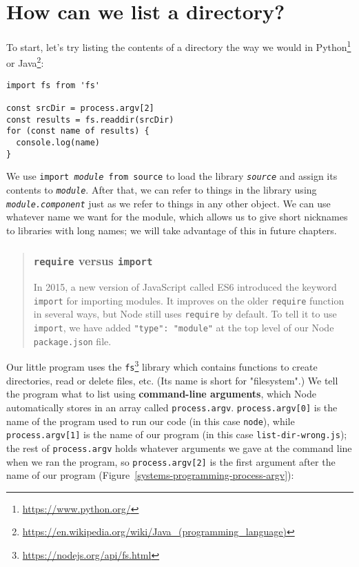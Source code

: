\documentclass[krantzl]{krantz}
\newcommand{\figref}[1]{Figure~\ref{#1}}
\newcommand{\glossref}[1]{\textbf{#1}}
\newenvironment{callout}{\savenotes\begin{tBox}\begin{quotation}\toggletrue{inbox}\renewcommand{\thempfootnote}{\arabic{footnote}}}{\end{quotation}\vspace{\baselineskip}\end{tBox}\togglefalse{inbox}\spewnotes}
\newcommand{\hreffoot}[2]{{#1}\footnote{\href{#2}{#2}}}
\begin{document}
\section{How can we list a directory?}\label{systems-programming-ls}


To start,
let's try listing the contents of a directory the way we would in \hreffoot{Python}{https://www.python.org/}
or \hreffoot{Java}{https://en.wikipedia.org/wiki/Java\_(programming\_language)}:


\begin{lstlisting}[frame=single,frameround=tttt]
import fs from 'fs'

const srcDir = process.argv[2]
const results = fs.readdir(srcDir)
for (const name of results) {
  console.log(name)
}
\end{lstlisting}



\noindent We use \texttt{import \emph{module} from {\textquotesingle}source{\textquotesingle}} to load the library \texttt{\emph{source}}
and assign its contents to \texttt{\emph{module}}.
After that,
we can refer to things in the library using \texttt{\emph{module.component}}
just as we refer to things in any other object.
We can use whatever name we want for the module,
which allows us to give short nicknames to libraries with long names;
we will take advantage of this in future chapters.

\begin{callout}


\subsubsection*{\texttt{require} versus \texttt{import}}


In 2015, a new version of JavaScript called ES6 introduced
the keyword \texttt{import} for importing modules.
It improves on the older \texttt{require} function in several ways,
but Node still uses \texttt{require} by default.
To tell it to use \texttt{import},
we have added \texttt{"type": "module"} at the top level of our Node \texttt{package.json} file.

\end{callout}


Our little program uses the \hreffoot{\texttt{fs}}{https://nodejs.org/api/fs.html} library
which contains functions to create directories, read or delete files, etc.
(Its name is short for "filesystem".)
We tell the program what to list using \glossref{command-line arguments},
which Node automatically stores in an array called \texttt{process.argv}.
\texttt{process.argv[0]} is the name of the program used to run our code (in this case \texttt{node}),
while \texttt{process.argv[1]} is the name of our program (in this case \texttt{list-dir-wrong.js});
the rest of \texttt{process.argv} holds whatever arguments we gave at the command line when we ran the program,
so \texttt{process.argv[2]} is the first argument after the name of our program (\figref{systems-programming-process-argv}):
\end{document}
